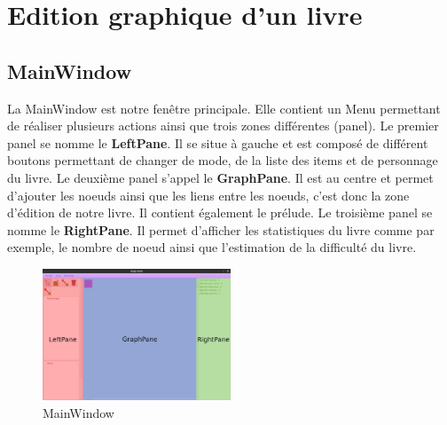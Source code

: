 	\section{Edition graphique d'un livre}

		\subsection{MainWindow}
			La MainWindow est notre fenêtre principale. Elle contient un Menu permettant de réaliser plusieurs actions ainsi que trois zones différentes (panel). Le premier panel se nomme le \textbf{LeftPane}. Il se situe à gauche et est composé de différent boutons permettant de changer de mode, de la liste des items et de personnage du livre. Le deuxième panel s'appel le \textbf{GraphPane}. Il est au centre et permet d'ajouter les noeuds ainsi que les liens entre les noeuds, c'est donc la zone d'édition de notre livre. Il contient également le prélude. Le troisième panel se nomme le \textbf{RightPane}. Il permet d'afficher les statistiques du livre comme par exemple, le nombre de noeud ainsi que l'estimation de la difficulté du livre.

			\begin{figure}[H]
				\centering\includegraphics[width=0.50\textwidth]{img/mainwindow.png}
				\caption{MainWindow}
				\label{fig:MainWindow}
			\end{figure}

